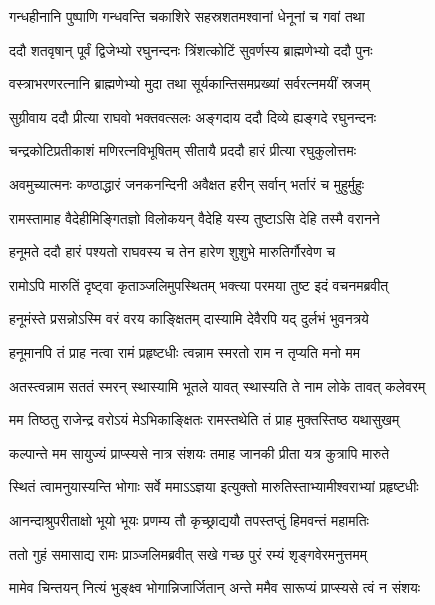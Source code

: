 \twolineshloka
{गन्धहीनानि पुष्पाणि गन्धवन्ति चकाशिरे}
{सहस्रशतमश्वानां धेनूनां च गवां तथा} %

\twolineshloka
{ददौ शतवृषान् पूर्वं द्विजेभ्यो रघुनन्दनः}
{त्रिंशत्कोटिं सुवर्णस्य ब्राह्मणेभ्यो ददौ पुनः} %

\twolineshloka
{वस्त्राभरणरत्नानि ब्राह्मणेभ्यो मुदा तथा}
{सूर्यकान्तिसमप्रख्यां सर्वरत्नमयीं स्रजम्} %

\twolineshloka
{सुग्रीवाय ददौ प्रीत्या राघवो भक्तवत्सलः}
{अङ्गदाय ददौ दिव्ये ह्यङ्गदे रघुनन्दनः} %

\twolineshloka
{चन्द्रकोटिप्रतीकाशं मणिरत्नविभूषितम्}
{सीतायै प्रददौ हारं प्रीत्या रघुकुलोत्तमः} %

\twolineshloka
{अवमुच्यात्मनः कण्ठाद्धारं जनकनन्दिनी}
{अवैक्षत हरीन् सर्वान् भर्तारं च मुहुर्मुहुः} %

\twolineshloka
{रामस्तामाह वैदेहीमिङ्गितज्ञो विलोकयन्}
{वैदेहि यस्य तुष्टाऽसि देहि तस्मै वरानने} %

\twolineshloka
{हनूमते ददौ हारं पश्यतो राघवस्य च}
{तेन हारेण शुशुभे मारुतिर्गौरवेण च} %

\twolineshloka
{रामोऽपि मारुतिं दृष्ट्वा कृताञ्जलिमुपस्थितम्}
{भक्त्या परमया तुष्ट इदं वचनमब्रवीत्} %

\twolineshloka
{हनूमंस्ते प्रसन्नोऽस्मि वरं वरय काङ्क्षितम्}
{दास्यामि देवैरपि यद् दुर्लभं भुवनत्रये} %

\twolineshloka
{हनूमानपि तं प्राह नत्वा रामं प्रहृष्टधीः}
{त्वन्नाम स्मरतो राम न तृप्यति मनो मम} %

\twolineshloka
{अतस्त्वन्नाम सततं स्मरन् स्थास्यामि भूतले}
{यावत् स्थास्यति ते नाम लोके तावत् कलेवरम्} %

\twolineshloka
{मम तिष्ठतु राजेन्द्र वरोऽयं मेऽभिकाङ्क्षितः}
{रामस्तथेति तं प्राह मुक्तस्तिष्ठ यथासुखम्} %

\twolineshloka
{कल्पान्ते मम सायुज्यं प्राप्स्यसे नात्र संशयः}
{तमाह जानकी प्रीता यत्र कुत्रापि मारुते} %

\twolineshloka
{स्थितं त्वामनुयास्यन्ति भोगाः सर्वे ममाऽऽज्ञया}
{इत्युक्तो मारुतिस्ताभ्यामीश्वराभ्यां प्रहृष्टधीः} %

\twolineshloka
{आनन्दाश्रुपरीताक्षो भूयो भूयः प्रणम्य तौ}
{कृच्छ्राद्ययौ तपस्तप्तुं हिमवन्तं महामतिः} %

\twolineshloka
{ततो गुहं समासाद्य रामः प्राञ्जलिमब्रवीत्}
{सखे गच्छ पुरं रम्यं शृङ्गवेरमनुत्तमम्} %

\twolineshloka
{मामेव चिन्तयन् नित्यं भुङ्क्ष्व भोगान्निजार्जितान्}
{अन्ते ममैव सारूप्यं प्राप्स्यसे त्वं न संशयः} %

